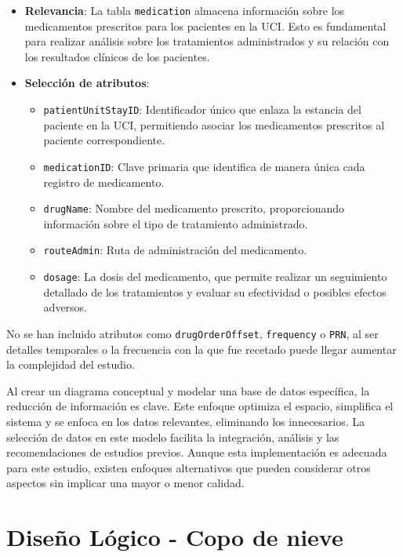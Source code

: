 \documentclass[12pt, a4paper, twoside]{article}
\begin{document}
	\begin{itemize}
		\item \textbf{Relevancia}: La tabla \texttt{medication} almacena información sobre los medicamentos prescritos para los pacientes en la UCI. Esto es fundamental para realizar análisis sobre los tratamientos administrados y su relación con los resultados clínicos de los pacientes.
		
		\item \textbf{Selección de atributos}:
		\begin{itemize}
			\item \texttt{patientUnitStayID}: Identificador único que enlaza la estancia del paciente en la UCI, permitiendo asociar los medicamentos prescritos al paciente correspondiente.
			\item \texttt{medicationID}: Clave primaria que identifica de manera única cada registro de medicamento.
			\item \texttt{drugName}: Nombre del medicamento prescrito, proporcionando información sobre el tipo de tratamiento administrado.
			\item \texttt{routeAdmin}: Ruta de administración del medicamento.
			\item \texttt{dosage}: La dosis del medicamento, que permite realizar un seguimiento detallado de los tratamientos y evaluar su efectividad o posibles efectos adversos.
		\end{itemize}
	\end{itemize}
	
	No se han incluido atributos como \texttt{drugOrderOffset}, \texttt{frequency} o \texttt{PRN}, al ser detalles temporales o la frecuencia con la que fue recetado puede llegar aumentar la complejidad del estudio. \cite{eICU2024}
	
	Al crear un diagrama conceptual y modelar una base de datos específica, la reducción de información es clave. Este enfoque optimiza el espacio, simplifica el sistema y se enfoca en los datos relevantes, eliminando los innecesarios. La selección de datos en este modelo facilita la integración, análisis y las recomendaciones de estudios previos. Aunque esta implementación es adecuada para este estudio, existen enfoques alternativos que pueden considerar otros aspectos sin implicar una mayor o menor calidad.
	
	
	\section{Diseño Lógico - Copo de nieve}
	
\end{document}
